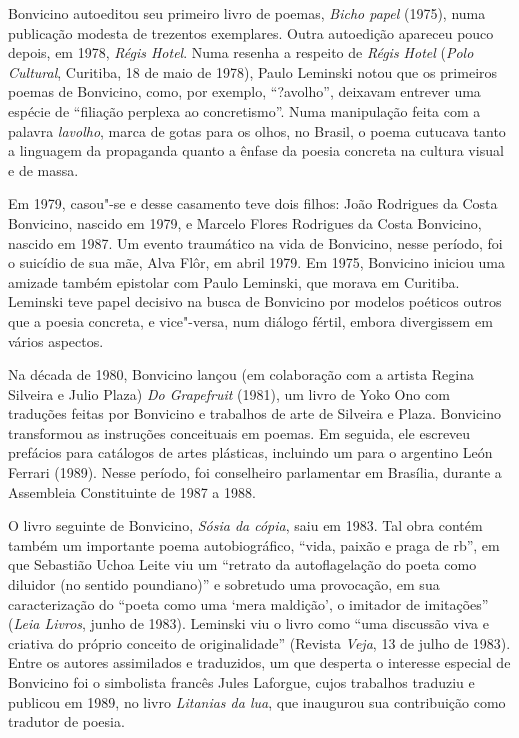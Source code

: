 Bonvicino autoeditou seu primeiro livro de poemas, \emph{Bicho papel}
(1975), numa publicação modesta de trezentos exemplares. Outra
autoedição apareceu pouco depois, em 1978, \emph{Régis Hotel}. Numa
resenha a respeito de \emph{Régis Hotel} (\emph{Polo Cultural},
Curitiba, 18 de maio de 1978), Paulo Leminski notou que os primeiros
poemas de Bonvicino, como, por exemplo, ``?avolho'', deixavam entrever
uma espécie de ``filiação perplexa ao concretismo''. Numa manipulação
feita com a palavra \emph{lavolho}, marca de gotas para os olhos, no
Brasil, o poema cutucava tanto a linguagem da propaganda quanto a ênfase
da poesia concreta na cultura visual e de massa.

Em 1979, casou"-se e desse casamento teve dois filhos: João Rodrigues da
Costa Bonvicino, nascido em 1979, e Marcelo Flores Rodrigues da Costa
Bonvicino, nascido em 1987. Um evento traumático na vida de Bonvicino,
nesse período, foi o suicídio de sua mãe, Alva Flôr, em abril 1979. Em
1975, Bonvicino iniciou uma amizade também epistolar com Paulo Leminski,
que morava em Curitiba. Leminski teve papel decisivo na busca de
Bonvicino por modelos poéticos outros que a poesia concreta, e
vice"-versa, num diálogo fértil, embora divergissem em vários aspectos.

Na década de 1980, Bonvicino lançou (em colaboração com a artista Regina
Silveira e Julio Plaza) \emph{Do Grapefruit} (1981), um livro de Yoko
Ono com traduções feitas por Bonvicino e trabalhos de arte de Silveira e
Plaza. Bonvicino transformou as instruções conceituais em poemas. Em
seguida, ele escreveu prefácios para catálogos de artes plásticas,
incluindo um para o argentino León Ferrari (1989). Nesse período, foi
conselheiro parlamentar em Brasília, durante a Assembleia Constituinte
de 1987 a 1988.

O livro seguinte de Bonvicino, \emph{Sósia da cópia}, saiu em 1983. Tal
obra contém também um importante poema autobiográfico, ``vida, paixão e
praga de rb'', em que Sebastião Uchoa Leite viu um ``retrato da
autoflagelação do poeta como diluidor (no sentido poundiano)'' e
sobretudo uma provocação, em sua caracterização do ``poeta como uma
`mera maldição', o imitador de imitações'' (\emph{Leia Livros}, junho de
1983). Leminski viu o livro como ``uma discussão viva e criativa do
próprio conceito de originalidade'' (Revista \emph{Veja}, 13 de julho de
1983). Entre os autores assimilados e traduzidos, um que desperta o
interesse especial de Bonvicino foi o simbolista francês Jules Laforgue,
cujos trabalhos traduziu e publicou em 1989, no livro \emph{Litanias da
lua}, que inaugurou sua contribuição como tradutor de poesia.

